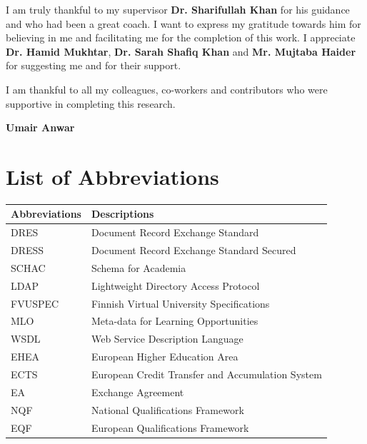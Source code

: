 \documentclass[12pt,a4paper,oneside]{book}
\begin{document}
I am truly thankful to my supervisor {\bfseries Dr. Sharifullah Khan} for his guidance and who had been a great coach. I want to express my gratitude towards him for believing in me and facilitating me for the completion of this work. I appreciate {\bfseries Dr. Hamid Mukhtar}, {\bfseries Dr. Sarah Shafiq Khan} and {\bfseries Mr. Mujtaba Haider} for suggesting me and for their support. 

I am thankful to all my colleagues, co-workers and contributors who were supportive in completing this research.

\begin{flushright} \textbf{Umair Anwar} \end{flushright}

\tableofcontents
%
%
%
\chapter*{List of Abbreviations}

\begin{table}[h]
    \renewcommand{\arraystretch}{1.3}
    \label{table:table1}
     \begin{tabular}{ll}
        \hline\hline
            {\bfseries Abbreviations} & {\bfseries Descriptions} \\
            \hline                                      %
            DRES & Document Record Exchange Standard  \\
            DRESS & Document Record Exchange Standard Secured  \\
            SCHAC & Schema for Academia  \\
            LDAP & Lightweight Directory Access Protocol \\
            FVUSPEC & Finnish Virtual University Specifications  \\
            MLO & Meta-data for Learning Opportunities  \\
            WSDL & Web Service Description Language  \\
            EHEA & European Higher Education Area  \\
            ECTS & European Credit Transfer and Accumulation System  \\
            EA & Exchange Agreement  \\
            NQF & National Qualifications Framework  \\
            EQF & European Qualifications Framework  \\
            \hline                          %
    \end{tabular}
\end{table}
\end{document}
